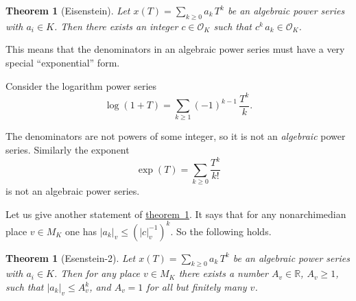 \documentclass{article}
\renewcommand{\O}{\mathcal{O}}
\newcommand{\refref}[2]{\hyperref[#2]{#1~\ref*{#2}}}
\newcommand{\examplesymbol}{$\blacktriangle$}
\renewcommand{\qedsymbol}{$\blacksquare$}
\theoremstyle{myplain}
\newtheorem{theorem}[proposition]{Theorem}
\theoremstyle{mydefinition}
\newenvironment{example}
  {\pushQED{\qed}\renewcommand{\qedsymbol}{\examplesymbol}\examplex}
  {\popQED\endexamplex}
\begin{document}
\begin{theorem}[Eisenstein]\label{theorem:eisenstein-1}
  Let $x (T) = \sum_{k \ge 0} a_k\,T^k$ be an algebraic power series with
  $a_i \in K$. Then there exists an integer $c \in \O_K$ such that
  $c^k \, a_k \in \O_K$.
\end{theorem}

This means that the denominators in an algebraic power series must have a very
special ``exponential'' form.

\begin{example}
  Consider the logarithm power series
  \[ \log (1+T) = \sum_{k \ge 1} (-1)^{k-1} \, \frac{T^k}{k}. \]

  The denominators are not powers of some integer, so it is not an
  \emph{algebraic} power series. Similarly the exponent
  $$\exp (T) = \sum_{k \ge 0} \frac{T^k}{k!}$$
  is not an algebraic power series.
\end{example}

Let us give another statement of \refref{theorem}{theorem:eisenstein-1}. It says
that for any nonarchimedian place $v \in M_K$ one has
$|a_k|_v \le (|c|_v^{-1})^k$. So the following holds.

\begin{theorem}[Esenstein-2]\label{theorem:eisenstein-2}
  Let $x (T) = \sum_{k \ge 0} a_k\,T^k$ be an algebraic power series with
  $a_i \in K$. Then for any place $v \in M_K$ there exists a number
  $A_v \in \mathbb{R}$, $A_v \ge 1$, such that $|a_k|_v \le A_v^k$, and
  $A_v = 1$ for all but finitely many $v$.
\end{theorem}
\end{document}
